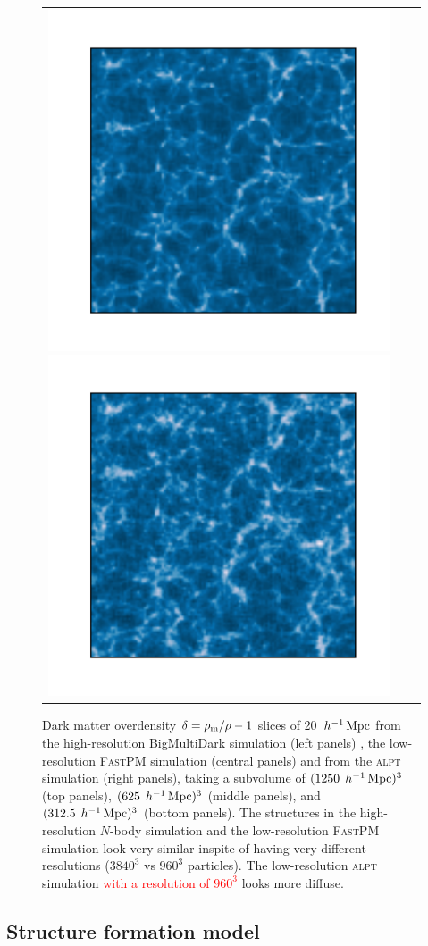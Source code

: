 \documentclass[english,usenatbib]{mn2e}
\newcommand{\tod}[1]{{\textcolor{red}{ #1}}}
\newcommand{\mperh}{\,h^{-1}\,{\rm Mpc}}
\begin{document}
\begin{figure}
\begin{tabular}{ccc}
\includegraphics[width=0.6\columnwidth]{fastpm_small}
\includegraphics[width=0.6\columnwidth]{alpt_small}
\end{tabular}
\caption{\label{fig:darkmatter} Dark matter overdensity $\delta = \rho_{\rm m}/\rho -1$ slices of 20 $\mperh$ from the high-resolution BigMultiDark simulation (left panels) , the low-resolution \textsc{FastPM} simulation (central panels) and from the \textsc{alpt} simulation (right panels), taking a subvolume of $(1250 \;\mperh)^3$ (top panels), $(625 \;\mperh)^3$ (middle panels), and $(312.5 \;\mperh)^3$ (bottom panels). The structures in the high-resolution $N$-body simulation and the low-resolution \textsc{FastPM} simulation look very similar inspite of having very different resolutions ($3840^3$ vs $960^3$ particles). The low-resolution \textsc{alpt} simulation \tod{with a resolution of $960^3$} looks more diffuse.}
\end{figure}

\subsection{Structure formation model}
\label{sec:sf}
\end{document}
